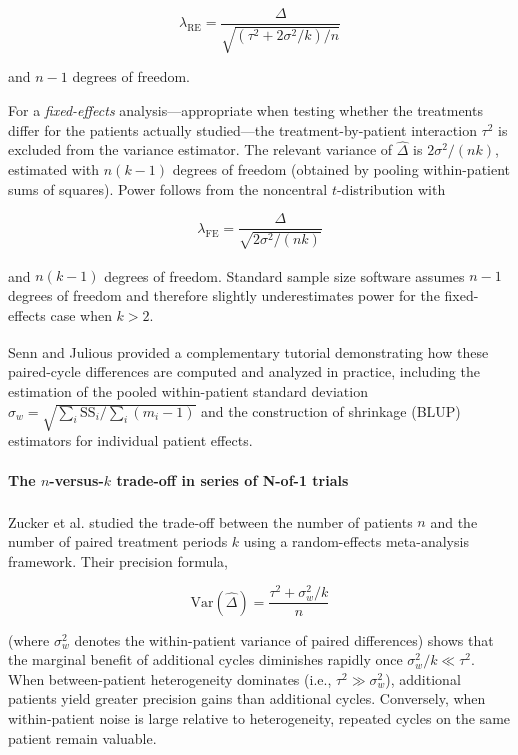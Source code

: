 \documentclass[
  11pt,
]{article}
\begin{document}
\[\lambda_{\text{RE}} =
  \frac{\Delta}{\sqrt{(\tau^2 + 2\sigma^2/k)/n}}\]

and \(n - 1\) degrees of freedom.

For a \emph{fixed-effects} analysis---appropriate when testing whether
the treatments differ for the patients actually studied---the
treatment-by-patient interaction \(\tau^2\) is excluded from the
variance estimator. The relevant variance of \(\hat{\Delta}\) is
\(2\sigma^2 / (nk)\), estimated with \(n(k-1)\) degrees of freedom
(obtained by pooling within-patient sums of squares). Power follows from
the noncentral \(t\)-distribution with

\[\lambda_{\text{FE}} =
  \frac{\Delta}{\sqrt{2\sigma^2/(nk)}}\]

and \(n(k-1)\) degrees of
freedom\textsuperscript{}.
Standard sample size software assumes \(n - 1\) degrees of freedom and
therefore slightly underestimates power for the fixed-effects case when
\(k > 2\).

Senn and
Julious\textsuperscript{}
provided a complementary tutorial demonstrating how these paired-cycle
differences are computed and analyzed in practice, including the
estimation of the pooled within-patient standard deviation
\(\hat{\sigma}_w = \sqrt{\sum_i \text{SS}_i / \sum_i(m_i - 1)}\) and the
construction of shrinkage (BLUP) estimators for individual patient
effects.

\paragraph{\texorpdfstring{The \(n\)-versus-\(k\) trade-off in series of
N-of-1
trials}{The n-versus-k trade-off in series of N-of-1 trials}}\label{the-n-versus-k-trade-off-in-series-of-n-of-1-trials}

Zucker et
al.\textsuperscript{}
studied the trade-off between the number of patients \(n\) and the
number of paired treatment periods \(k\) using a random-effects
meta-analysis framework. Their precision formula,

\[\text{Var}(\hat{\Delta}) =
  \frac{\tau^2 + \sigma^2_w / k}{n}\]

(where \(\sigma^2_w\) denotes the within-patient variance of paired
differences) shows that the marginal benefit of additional cycles
diminishes rapidly once \(\sigma^2_w / k \ll \tau^2\). When
between-patient heterogeneity dominates (i.e.,
\(\tau^2 \gg \sigma^2_w\)), additional patients yield greater precision
gains than additional cycles. Conversely, when within-patient noise is
large relative to heterogeneity, repeated cycles on the same patient
remain valuable.
\end{document}
